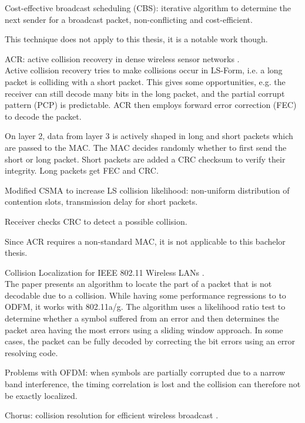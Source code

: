 Cost-effective broadcast scheduling (CBS): iterative algorithm to determine the next sender for a broadcast packet, non-conflicting and cost-efficient.

This technique does not apply to this thesis, it is a notable work though.

ACR: active collision recovery in dense wireless sensor networks \cite{wu2010}.\\

Active collision recovery tries to make collisions occur in LS-Form, i.e. a long packet is colliding with a short packet. This gives some opportunities, e.g. the receiver can still decode many bits in the long packet, and the partial corrupt pattern (PCP) is predictable. ACR then employs forward error correction (FEC) to decode the packet.

On layer 2, data from layer 3 is actively shaped in long and short packets which are passed to the MAC. The MAC decides randomly whether to first send the short or long packet. Short packets are added a CRC checksum to verify their integrity. Long packets get FEC and CRC.

Modified CSMA to increase LS collision likelihood: non-uniform distribution of contention slots, transmission delay for short packets.

Receiver checks CRC to detect a possible collision.

Since ACR requires a non-standard MAC, it is not applicable to this bachelor thesis.

Collision Localization for IEEE 802.11 Wireless LANs \cite{keene2010}.\\

The paper presents an algorithm to locate the part of a packet that is not decodable due to a collision. While having some performance regressions to to ODFM, it works with 802.11a/g. The algorithm uses a likelihood ratio test to determine whether a symbol suffered from an error and then determines the packet area having the most errors using a sliding window approach. In some cases, the packet can be fully decoded by correcting the bit errors using an error resolving code.

Problems with OFDM: when symbols are partially corrupted due to a narrow band interference, the timing correlation is lost and the collision can therefore not be exactly localized.

Chorus: collision resolution for efficient wireless broadcast \cite{zhang2010}.\\

